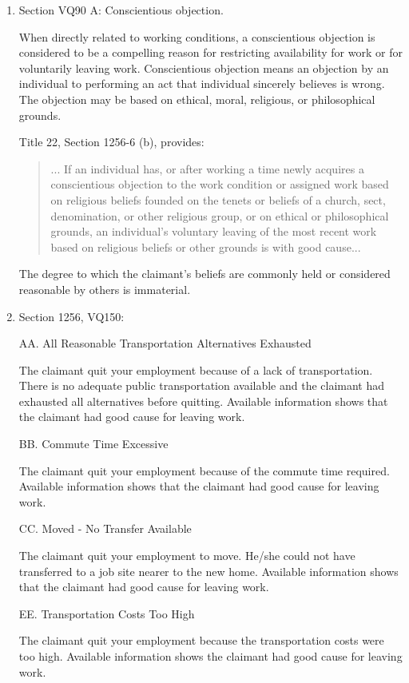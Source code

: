 \documentclass[12pt]{article}
\newcommand{\1}{\mathbf{1}}
\begin{document}
\begin{appendix}
\begin{enumerate}

\item Section VQ90 A: Conscientious objection.

When directly related to working conditions, a conscientious objection is considered to be a compelling reason for restricting availability for work or for voluntarily leaving work. Conscientious objection means an objection by an individual to performing an act that individual sincerely believes is wrong. The objection may be based on ethical, moral, religious, or philosophical grounds.

Title 22, Section 1256-6 (b), provides:
\begin{quotation} ... If an individual has, or after working a time newly acquires a conscientious objection to the work condition or assigned work based on religious beliefs founded on the tenets or beliefs of a church, sect, denomination, or other religious group, or on ethical or philosophical grounds, an individual's voluntary leaving of the most recent work based on religious beliefs or other grounds is with good cause...
\end{quotation}
The degree to which the claimant's beliefs are commonly held or considered reasonable by others is immaterial.

\item Section 1256, VQ150:

AA. All Reasonable Transportation Alternatives Exhausted

The claimant quit your employment because of a lack of transportation. There is no adequate public transportation available and the claimant had exhausted all alternatives before quitting. Available information shows that the claimant had good cause for leaving work.

BB. Commute Time Excessive

The claimant quit your employment because of the commute time required. Available information shows that the claimant had good cause for leaving work.

CC. Moved - No Transfer Available

The claimant quit your employment to move. He/she could not have transferred to a job site nearer to the new home. Available information shows that the claimant had good cause for leaving work.

EE. Transportation Costs Too High

The claimant quit your employment because the transportation costs were too high. Available information shows the claimant had good cause for leaving work.



\end{enumerate}
\end{appendix}
\end{document}
